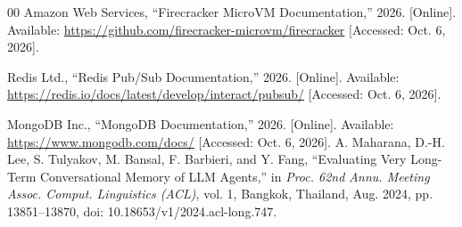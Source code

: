 {\begin{thebibliography}{00}
 Amazon Web Services, ``Firecracker MicroVM Documentation,'' 2026. [Online]. Available: \url{https://github.com/firecracker-microvm/firecracker} [Accessed: Oct. 6, 2026].

 Redis Ltd., ``Redis Pub/Sub Documentation,'' 2026. [Online]. Available: \url{https://redis.io/docs/latest/develop/interact/pubsub/} [Accessed: Oct. 6, 2026].

 MongoDB Inc., ``MongoDB Documentation,'' 2026. [Online]. Available: \url{https://www.mongodb.com/docs/} [Accessed: Oct. 6, 2026].
 A. Maharana, D.-H. Lee, S. Tulyakov, M. Bansal, F. Barbieri, and Y. Fang, ``Evaluating Very Long-Term Conversational Memory of LLM Agents,'' in \emph{Proc. 62nd Annu. Meeting Assoc. Comput. Linguistics (ACL)}, vol. 1, Bangkok, Thailand, Aug. 2024, pp. 13851--13870, doi: 10.18653/v1/2024.acl-long.747.

\end{thebibliography}
}
